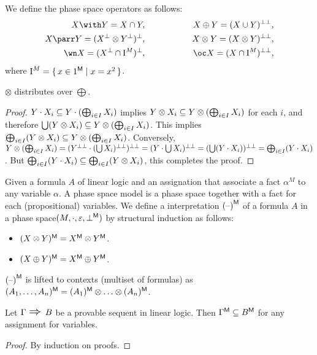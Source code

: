 \begin{definition} 
We define the phase space operators as follows:
\begin{eqnarray*}
X \with Y =  X \cap Y,
 &\phantom{XXXXX}&  X \oplus  Y  = \dlnegP{X \cup Y}, \\ 
X \parr  Y  = \lnegP{\lneg{X} \otimes \lneg{Y}} ,
 &\phantom{XXXXX}& X \otimes Y = \dlnegP{X \otimes Y},\\
\wn X = \lnegP{\lneg{X} \cap \PSexpStandard},
 &\phantom{XXXXX}& \oc X = \dlnegP{X \cap \PSexpStandard},
\end{eqnarray*}
where ${\mbox{\boldmath{I}}}^{M} = \set{ x \in {\mbox{\boldmath{1}}}^{\sf M}| x = x^2 }$. 
\end{definition}
\begin{proposition}
$\otimes$ distributes over $\bigoplus$. 
\end{proposition}
\begin{proof}
$ Y \cdot X_i \subseteq Y \cdot (\bigoplus_ {i \in I} X_i)$ implies 
$Y \otimes X_i \subseteq Y \otimes(\bigoplus_ {i \in I} X_i)$ for each $i$, 
and therefore $\bigcup (Y \otimes X_i) \subseteq Y \otimes(\bigoplus_ {i \in I} X_i)$. 
This implies $ \bigoplus_ {i \in I} (Y \otimes X_i)  \subseteq Y \otimes(\bigoplus_ {i \in I} X_i) $.
Conversely,  $Y \otimes(\bigoplus_ {i \in I} X_i) = {({{Y}^{\bot\bot}} \cdot {(\bigcup X_i)^{\bot\bot}})^{\bot\bot}}
= {(Y \cdot \bigcup X_i)^{\bot\bot}} = {( \bigcup (Y \cdot X_i))^{\bot\bot}} =  \bigoplus_ {i \in I} (Y \cdot X_i)$. 
But $\bigoplus_ {i \in I} (Y \cdot X_i) \subseteq \bigoplus_ {i \in I} (Y \otimes X_i)$, this completes the proof. 
\end{proof}
\begin{definition} 
Given a formula $A$ of linear logic and an assignation that associate a fact $\alpha^{M}$ to any variable $\alpha$. 
A phase space model is a phase space together with a fact  for each (propositional) variables. 
We define a interpretation ${{(\mbox{\textendash})}}^{\sf M}$ of a formula  $A$ in a phase space$(M,\cdot,\varepsilon,{\bot}^{\sf M})$  by structural induction as follows:
\begin{itemize}
\item $(X \otimes Y)^{\sf M} = {X}^{\sf M} \otimes {Y}^{\sf M}$.
\item $(X \oplus  Y)^{\sf M}   = {X}^{\sf M} \oplus {Y}^{\sf M}$.
\end{itemize}
${{(\mbox{\textendash})}}^{\sf M}$ is lifted to contexts (multiset of formulas)  as  
%
$(A_1,\ldots,A_n)^{\sf M} 
   = (A_1)^{\sf M} \otimes \ldots \otimes (A_n)^{\sf M}$.
%
\end{definition}


\begin{theorem}[Soundness]
Let $\Gamma \mbox{ \Large$\Rightarrow$ } B$ be a provable sequent in linear logic.
Then $ {\Gamma}^{\sf M} \subseteq {B}^{\sf M}$ for any assignment for variables. 
\end{theorem}
\begin{proof}
By induction  on proofs.
\end{proof}


